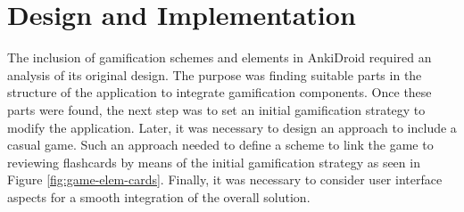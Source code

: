 
\chapter{Design and Implementation} %

\label{desi} %

The inclusion of gamification schemes and elements in AnkiDroid required an analysis of its original design. The purpose was finding suitable parts in the structure of the application to integrate gamification components. Once these parts were found, the next step was to set an initial gamification strategy to modify the application. Later, it was necessary to design an approach to include a casual game. Such an approach needed to define a scheme to link the game to reviewing flashcards by means of the initial gamification strategy as seen in Figure \ref{fig:game-elem-cards}. Finally, it was necessary to consider user interface aspects for a smooth integration of the overall solution.

